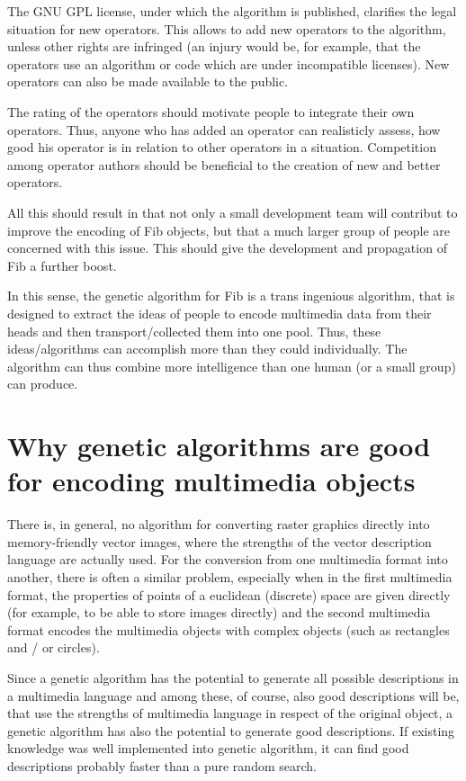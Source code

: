 The GNU GPL license, under which the algorithm is published, clarifies the legal situation for new operators. This allows to add new operators to the algorithm, unless other rights are infringed (an injury would be, for example, that the operators use an algorithm or code which are under incompatible licenses). New operators can also be made available to the public.

The rating of the operators should motivate people to integrate their own operators. Thus, anyone who has added an operator can realisticly assess, how good his operator is in relation to other operators in a situation. Competition among operator authors should be beneficial to the creation of new and better operators.

All this should result in that not only a small development team will contribut to improve the encoding of Fib objects, but that a much larger group of people are concerned with this issue. This should give the development and propagation of Fib a further boost.

In this sense, the genetic algorithm for Fib is a trans ingenious algorithm, that is designed to extract the ideas of people to encode multimedia data from their heads and then transport/collected them into one pool. Thus, these ideas/algorithms can accomplish more than they could individually. The algorithm can thus combine more intelligence than one human (or a small group) can produce.


\section{Why genetic algorithms are good for encoding multimedia objects}

There is, in general, no algorithm for converting raster graphics directly into memory-friendly vector images, where the strengths of the vector description language are actually used. For the conversion from one multimedia format into another, there is often a similar problem, especially when in the first multimedia format, the properties of points of a euclidean (discrete) space are given directly (for example, to be able to store images directly) and the second multimedia format encodes the multimedia objects with complex objects (such as rectangles and / or circles).

Since a genetic algorithm has the potential to generate all possible descriptions in a multimedia language and among these, of course, also good descriptions will be, that use the strengths of multimedia language in respect of the original object, a genetic algorithm has also the potential to generate good descriptions. If existing knowledge was well implemented into genetic algorithm, it can find good descriptions probably faster than a pure random search.


